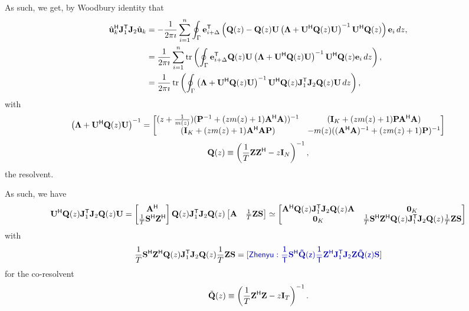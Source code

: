 \documentclass[11pt,a4paper]{article}
\newcommand {\zhenyu}[1]{{\color{BLUE}\sf{[Zhenyu: #1]}}}
\begin{document}
As such, we get, by Woodbury identity that
\begin{align*}
		\hat \uu_k^\H \J_1^\T \J_2 \hat \uu_k &= -\frac1{2 \pi \imath} \sum_{i=1}^n \oint_{\Gamma} \ee_{i + \Delta}^\T \left(  \Q(z) - \Q(z) \U \left( \bLambda + \U^\H \Q(z) \U \right)^{-1} \U^\H \Q(z) \right) \ee_{i}\,dz, \\ 
		&=\frac1{2 \pi \imath} \sum_{i=1}^n \tr \left(  \oint_{\Gamma} \ee_{i + \Delta}^\T \Q(z) \U \left( \bLambda + \U^\H \Q(z) \U \right)^{-1} \U^\H \Q(z) \ee_{i}\,dz \right), \\ 
		&=\frac1{2 \pi \imath} \tr \left( \oint_{\Gamma} \left( \bLambda + \U^\H \Q(z) \U \right)^{-1} \U^\H \Q(z) \J_1^\T \J_2 \Q(z) \U\,dz \right),
\end{align*}
with 
\begin{equation}
    \left( \bLambda + \U^\H \Q(z) \U \right)^{-1} = \begin{bmatrix} (z+\frac{1}{m(z)})(\P^{-1} + (zm(z)+1)\A^ \H \A))^{-1} & (\I_K+(zm(z)+1)\P \A^ \H \A) \\ (\I_K+(zm(z)+1) \A^ \H \A \P) & -m(z)((\A^ \H \A)^{-1}+(zm(z)+1)\P)^{-1} \end{bmatrix}
\end{equation}
\begin{equation}
	\Q(z) \equiv \left( \frac1T \Z \Z^\H - z \I_N \right)^{-1}, 
\end{equation}
the resolvent.

As such, we have
\begin{equation}
	\U^\H \Q(z) \J_1^\T \J_2 \Q(z) \U = \begin{bmatrix} \A^\H \\ \frac1T \S^\H \Z^\H \end{bmatrix} \Q(z) \J_1^\T \J_2 \Q(z) \begin{bmatrix} \A & \frac1T \Z \S \end{bmatrix} \simeq \begin{bmatrix} \A^\H \Q(z) \J_1^\T \J_2 \Q(z) \A & \zo_K \\ \zo_K & \frac1T \S^\H \Z^\H \Q(z) \J_1^\T \J_2 \Q(z) \frac1T \Z \S \end{bmatrix}
\end{equation}
with
\begin{equation}
\frac1T \S^\H \Z^\H \Q(z) \J_1^\T \J_2 \Q(z) \frac1T \Z \S = \zhenyu{\frac1T \S^\H \tilde \Q(z) \frac1T \Z^\H \J_1^\T \J_2 \Z \tilde \Q(z) \S }
\end{equation}
for the co-resolvent
\begin{equation}
	\tilde \Q(z) \equiv \left( \frac1T \Z^\H \Z  - z \I_T \right)^{-1}.
\end{equation}
\end{document}
